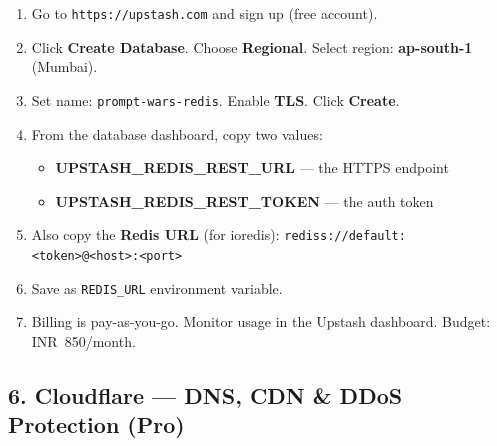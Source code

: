 \documentclass[11pt, a4paper]{article}
\begin{document}
\begin{tcolorbox}[stepbox, title={Step-by-Step: Upstash Redis Setup}]
\begin{enumerate}[leftmargin=1cm, itemsep=3pt]
    \item Go to \texttt{https://upstash.com} and sign up (free account).
    \item Click \textbf{Create Database}. Choose \textbf{Regional}. Select region: \textbf{ap-south-1} (Mumbai).
    \item Set name: \texttt{prompt-wars-redis}. Enable \textbf{TLS}. Click \textbf{Create}.
    \item From the database dashboard, copy two values:
        \begin{itemize}[leftmargin=0.8cm]
            \item \textbf{UPSTASH\_REDIS\_REST\_URL} --- the HTTPS endpoint
            \item \textbf{UPSTASH\_REDIS\_REST\_TOKEN} --- the auth token
        \end{itemize}
    \item Also copy the \textbf{Redis URL} (for ioredis):
          \texttt{rediss://default:<token>@<host>:<port>}
    \item Save as \texttt{REDIS\_URL} environment variable.
    \item Billing is pay-as-you-go. Monitor usage in the Upstash dashboard. Budget: INR~850/month.
\end{enumerate}
\end{tcolorbox}

\subsection{6. Cloudflare --- DNS, CDN \& DDoS Protection (Pro)}
\end{document}

